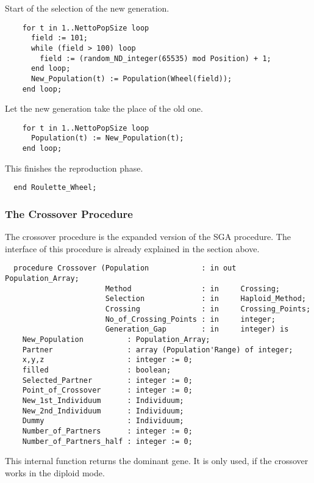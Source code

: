 Start of the selection of the new generation.
\begin{verbatim}
    for t in 1..NettoPopSize loop
      field := 101;
      while (field > 100) loop
        field := (random_ND_integer(65535) mod Position) + 1;
      end loop;
      New_Population(t) := Population(Wheel(field));
    end loop;
\end{verbatim}
Let the new generation take the place of the old one.
\begin{verbatim}
    for t in 1..NettoPopSize loop
      Population(t) := New_Population(t);
    end loop;
\end{verbatim}
This finishes the reproduction phase.
\begin{verbatim}
  end Roulette_Wheel;
\end{verbatim}
\subsubsection{The Crossover Procedure}
The crossover procedure is the expanded version of the SGA procedure. The interface of
this procedure is already explained in the section above.
\begin{verbatim}
  procedure Crossover (Population            : in out Population_Array;
                       Method                : in     Crossing;
                       Selection             : in     Haploid_Method;
                       Crossing              : in     Crossing_Points;
                       No_of_Crossing_Points : in     integer;
                       Generation_Gap        : in     integer) is
    New_Population          : Population_Array;
    Partner                 : array (Population'Range) of integer;
    x,y,z                   : integer := 0;
    filled                  : boolean;
    Selected_Partner        : integer := 0;
    Point_of_Crossover      : integer := 0;
    New_1st_Individuum      : Individuum;
    New_2nd_Individuum      : Individuum;
    Dummy                   : Individuum;
    Number_of_Partners      : integer := 0;
    Number_of_Partners_half : integer := 0;
\end{verbatim}
This internal function returns the dominant gene. It is only used, if the
crossover works in the diploid mode.
